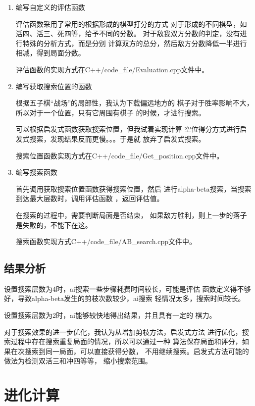\documentclass[UTF8]{article}
\begin{document}
\begin{enumerate}
    \item 编写自定义的评估函数
    
    \subitem 评估函数采用了常用的根据形成的棋型打分的方式
    对于形成的不同棋型，如活四、活三、死四等，给予不同的分数。
    对于敌我双方分数的判定，没有进行特殊的分析方式，而是分别
    计算双方的总分，然后敌方分数降低一半进行相减，得到局面分数。

    \subitem 评估函数的实现方式在C++/code\_file/Evaluation.cpp文件中。
    \item 编写获取搜索位置的函数
    
    \subitem 根据五子棋“战场”的局部性，我认为下载偏远地方的
    棋子对于胜率影响不大，所以对于一个位置，只有它周围有棋子
    的时候，才进行搜索。

    \subitem 可以根据启发式函数获取搜索位置，但我试着实现计算
    空位得分方式进行启发式搜索，发现结果反而更慢。。。于是就
    放弃了启发式搜索。

    \subitem 搜索位置函数实现方式在C++/code\_file/Get\_position.cpp文件中。
    \item 编写搜索函数
    
    \subitem 首先调用获取搜索位置函数获得搜索位置，然后
    进行alpha-beta搜索，当搜索到达最大层数时，调用评估函数
    ，返回评估值。

    \subitem 在搜索的过程中，需要判断局面是否结束，
    如果敌方胜利，则上一步的落子是失败的，不能下在这。

    \subitem 搜索函数实现方式C++/code\_file/AB\_search.cpp文件中。

\end{enumerate}

\subsection{结果分析}

设置搜索层数为4时，ai搜索一些步骤耗费时间较长，可能是评估
函数定义得不够好，导致alpha-beta发生的剪枝次数较少，ai搜索
轻情况太多，搜索时间较长。

设置搜索层数为2时，ai能够较快地得出结果，并且具有一定的
棋力。

对于搜索效果的进一步优化，我认为从增加剪枝方法，启发式方法
进行优化，搜索过程中存在搜索重复局面的情况，所以可以通过一种
算法保存局面和评分，如果在次搜索到同一局面，可以直接获得分数，
不用继续搜索。启发式方法可能的做法为检测双活三和冲四等等，
缩小搜索范围。


\section{进化计算}
\end{document}
